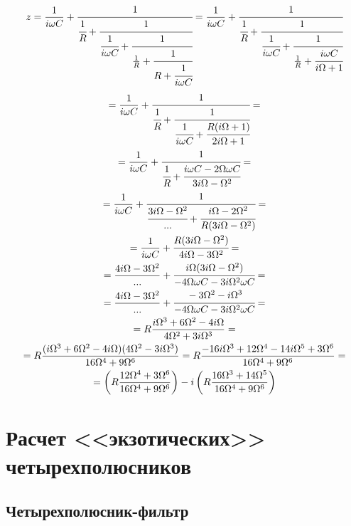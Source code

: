 \begin{equation}
	z=\frac{1}{i\omega C}+
	\cfrac{1}{
		\cfrac{1}{R}+
		\cfrac{1}{
			\cfrac{1}{i\omega C}+
			\cfrac{1}{
				\frac{1}{R}+
				\cfrac{1}{
					R+
					\cfrac{1}{
						i\omega C
					}
				}
			}
		}
	}=
	\frac{1}{i\omega C}+
	\cfrac{1}{
		\cfrac{1}{R}+
		\cfrac{1}{
			\cfrac{1}{i\omega C}+
			\cfrac{1}{
				\frac{1}{R}+
				\cfrac{i\omega C}{i\Omega+1}
			}
		}
	}
\end{equation}
\begin{gather}
	=
	\frac{1}{i\omega C}+
	\cfrac{1}{
		\cfrac{1}{R}+
		\cfrac{1}{
			\cfrac{1}{i\omega C}+
			\cfrac{R(i\Omega+1)}{2i\Omega+1}
		}
	}
	=\\=
	\frac{1}{i\omega C}+
	\cfrac{1}{
		\cfrac{1}{R}+
		\cfrac{i\omega C - 2\Omega \omega C}{3i\Omega-\Omega^2}
	}
	=\\=
	\frac{1}{i\omega C}+
	\cfrac{1}{
		\cfrac{3i\Omega-\Omega^2}{...}+
		\cfrac{i\Omega - 2\Omega^2}{R(3i\Omega-\Omega^2)}
	}
	=\\=
	\frac{1}{i\omega C}+
	\cfrac{R(3i\Omega-\Omega^2)}{4i\Omega - 3\Omega^2}
	=\\=
	\frac{4i\Omega - 3\Omega^2}{...}+
	\cfrac{i\Omega(3i\Omega-\Omega^2)}{-4\Omega\omega C - 3i\Omega^2\omega C}
	=\\=
	\frac{4i\Omega - 3\Omega^2}{...}+
	\cfrac{-3\Omega^2-i\Omega^3}{-4\Omega\omega C - 3i\Omega^2\omega C}
	=\\=
	R\frac{
		i\Omega^3
		+6\Omega^2
		-4i\Omega
	}{
		4\Omega^2
		+3i\Omega^3
	}
	=\\=
	R\frac{
		(i\Omega^3
		+6\Omega^2
		-4i\Omega )
		(
		4\Omega^2
		-3i\Omega^3
		)
	}{
		16\Omega^4
		+9\Omega^6
	}
	=R\frac{
		-16 i \Omega^3 + 12 \Omega^4 - 14 i \Omega^5 + 3 \Omega^6
	}{
		16\Omega^4
		+9\Omega^6
	}
	=\\=
	\left(
	R
	\frac{
		12 \Omega^4 + 3 \Omega^6
	}{
		16\Omega^4
		+9\Omega^6
	}
	\right)
	-i
	\left(
	R\frac{
		16 \Omega^3 + 14 \Omega^5
	}{
		16\Omega^4
		+9\Omega^6
	}
	\right)
\end{gather}

\section{Расчет <<экзотических>> четырехполюсников}

\subsection{Четырехполюсник-фильтр}

